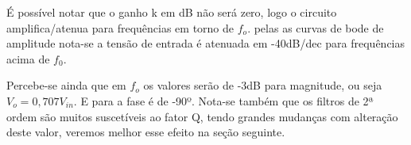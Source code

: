 É possível notar que o ganho k em dB não será zero, logo o circuito amplifica/atenua para frequências em torno de $f_o$. pelas as curvas de bode de amplitude nota-se a tensão de entrada é atenuada em -40dB/dec para frequências acima de $f_0$.

Percebe-se ainda que em $f_o$ os valores serão de -3dB para magnitude, ou seja $V_o=0,707V_{in}$. E para a fase é de -90º. Nota-se também que os filtros de 2ª ordem são muitos suscetíveis ao fator Q, tendo grandes mudanças com alteração deste valor, veremos melhor esse efeito na seção seguinte.

